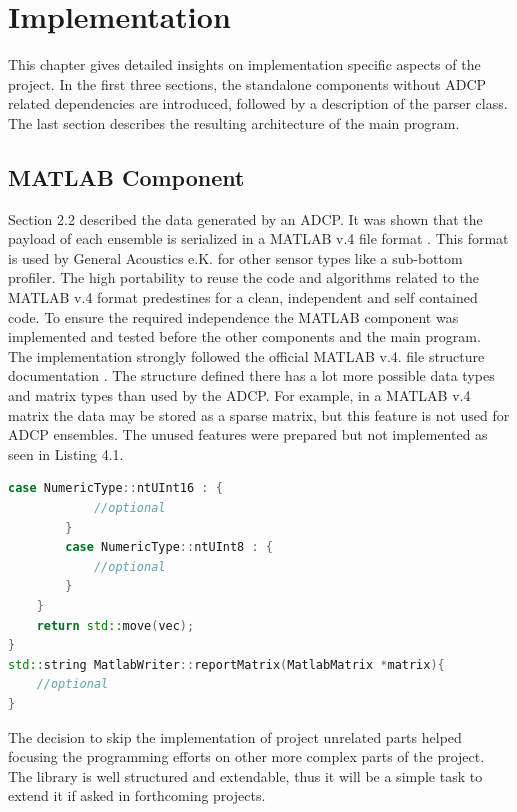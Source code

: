 \chapter{Implementation}
This chapter gives detailed insights on implementation specific aspects of the project. In the first three sections, the standalone components without ADCP related dependencies are introduced, followed by a description of the parser class. The last section describes the resulting architecture of the main program. 
\section{MATLAB Component}
Section 2.2 described the data generated by an ADCP. It was shown that the payload of each ensemble is serialized in a MATLAB v.4 file format \cite{matlab}. This format is used by General Acoustics e.K. for other sensor types like a sub-bottom profiler. The high portability to reuse the code and algorithms related to the MATLAB v.4 format predestines for a clean, independent and self contained code. To ensure the required independence the MATLAB component was implemented and tested before the other components and the main program.\\
The implementation strongly followed the official MATLAB v.4. file structure documentation \cite{matlab}. The structure defined there has a lot more possible data types and matrix types than used by the ADCP. For example, in a MATLAB v.4 matrix the data may be stored as a sparse matrix, but this feature is not used for ADCP ensembles. The unused features were prepared but not implemented as seen in Listing 4.1.
\pagebreak
\begin{lstlisting}[language=C++, caption=Code snippet of unimplemented logic]
        case NumericType::ntUInt16 : {
            //optional
        }
        case NumericType::ntUInt8 : {
            //optional
        }
    }
    return std::move(vec);
}
std::string MatlabWriter::reportMatrix(MatlabMatrix *matrix){
    //optional
}
\end{lstlisting}

The decision to skip the implementation of project unrelated parts helped focusing the programming efforts on other more complex parts of the project. The library is well structured and extendable, thus it will be a simple task to extend it if asked in forthcoming projects.

